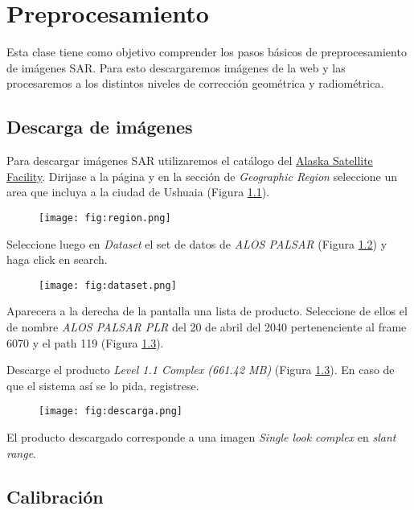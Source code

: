 \chapter{Preprocesamiento}

Esta clase tiene como objetivo comprender los pasos básicos de preprocesamiento de imágenes SAR. Para esto descargaremos imágenes de la web y las procesaremos a los distintos niveles de corrección geométrica y radiométrica.

\section{Descarga de imágenes}

Para descargar imágenes SAR utilizaremos el catálogo del \href{https://vertex.daac.asf.alaska.edu/}{Alaska Satellite Facility}. Dirijase a la página y en la sección de \emph{Geographic Region} seleccione un area que incluya a la ciudad de Ushuaia (Figura \ref{fig:region}).

\begin{figure}[h!]
    \centering
    \texttt{[image: fig:region.png]}
    \caption{}
    \label{fig:region}
\end{figure}

Seleccione luego en \emph{Dataset} el set de datos de \emph{ALOS PALSAR} (Figura \ref{fig:dataset}) y haga click en search.

\begin{figure}[h!]
    \centering
    \texttt{[image: fig:dataset.png]}
    \caption{}
    \label{fig:dataset}
\end{figure}

Aparecera a la derecha de la pantalla una lista de producto. Seleccione de ellos el de nombre \emph{ALOS PALSAR PLR} del 20 de abril del 2040 pertenenciente al frame 6070 y el path 119 (Figura \ref{fig:descarga}).

Descarge el producto \emph{Level 1.1 Complex (661.42 MB)} (Figura \ref{fig:descarga}). En caso de que el sistema así se lo pida, registrese.

\begin{figure}[h!]
    \centering
    \texttt{[image: fig:descarga.png]}
    \caption{}
    \label{fig:descarga}
\end{figure}

El producto descargado corresponde a una imagen \emph{Single look complex} en \emph{slant range}.

\section{Calibración}

